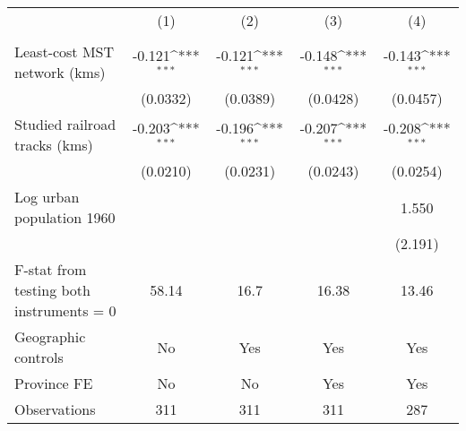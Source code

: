 {
\def\sym#1{\ifmmode^{#1}\else\(^{#1}\)\fi}
\begin{tabular}{l*{4}{c}}
\hline\hline
                &\multicolumn{1}{c}{(1)}&\multicolumn{1}{c}{(2)}&\multicolumn{1}{c}{(3)}&\multicolumn{1}{c}{(4)}\\
                &\multicolumn{1}{c}{}&\multicolumn{1}{c}{}&\multicolumn{1}{c}{}&\multicolumn{1}{c}{}\\
\hline
Least-cost MST network (kms)&   -0.121\sym{***}&   -0.121\sym{***}&   -0.148\sym{***}&   -0.143\sym{***}\\
                & (0.0332)         & (0.0389)         & (0.0428)         & (0.0457)         \\
[1em]
Studied railroad tracks (kms)&   -0.203\sym{***}&   -0.196\sym{***}&   -0.207\sym{***}&   -0.208\sym{***}\\
                & (0.0210)         & (0.0231)         & (0.0243)         & (0.0254)         \\
[1em]
Log urban population 1960&                  &                  &                  &    1.550         \\
                &                  &                  &                  &  (2.191)         \\
\hline
F-stat from testing both instruments = 0&    58.14         &     16.7         &    16.38         &    13.46         \\
Geographic controls&       No         &      Yes         &      Yes         &      Yes         \\
Province FE     &       No         &       No         &      Yes         &      Yes         \\
Observations    &      311         &      311         &      311         &      287         \\
\hline\hline
\end{tabular}
}
